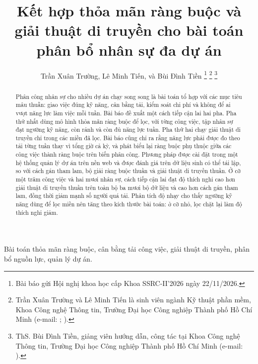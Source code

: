 \documentclass{IEEEtran}
\begin{document}
\title{Kết hợp thỏa mãn ràng buộc và giải thuật di truyền cho bài toán phân bổ nhân sự đa dự án}

\author{Trần Xuân Trường, Lê Minh Tiến, và Bùi Đình Tiền
\thanks{Bài báo gửi Hội nghị khoa học cấp Khoa SSRC-II'2026 ngày 22/11/2026.}
\thanks{Trần Xuân Trường và Lê Minh Tiến là sinh viên ngành Kỹ thuật phần mềm, Khoa Công nghệ Thông tin, Trường Đại học Công nghiệp Thành phố Hồ Chí Minh (e-mail: \underline{\hspace{3cm}}; \underline{\hspace{3cm}}).}
\thanks{ThS. Bùi Đình Tiền, giảng viên hướng dẫn, công tác tại Khoa Công nghệ Thông tin, Trường Đại học Công nghiệp Thành phố Hồ Chí Minh (e-mail: \underline{\hspace{3cm}}).}}

\maketitle

\begin{abstract}
Phân công nhân sự cho nhiều dự án chạy song song là bài toán tổ hợp với các mục tiêu mâu thuẫn: giao việc đúng kỹ năng, cân bằng tải, kiểm soát chi phí và không để ai vượt năng lực làm việc mỗi tuần. Bài báo đề xuất một cách tiếp cận lai hai pha. Pha thứ nhất dùng mô hình thỏa mãn ràng buộc để lọc, với từng công việc, tập nhân sự đạt ngưỡng kỹ năng, còn rảnh và còn đủ năng lực tuần. Pha thứ hai chạy giải thuật di truyền chỉ trong các miền đã lọc. Bài báo cũng chỉ ra rằng năng lực phải được đo theo tải từng tuần thay vì tổng giờ cả kỳ, và phát biểu lại ràng buộc phụ thuộc giữa các công việc thành ràng buộc trên biến phân công. Phương pháp được cài đặt trong một hệ thống quản lý dự án trên nền web và được đánh giá trên dữ liệu sinh có thể tái lập, so với cách gán tham lam, bộ giải ràng buộc thuần và giải thuật di truyền thuần. Ở cỡ một trăm công việc và hai mươi nhân sự, cách tiếp cận lai đạt độ thích nghi cao hơn giải thuật di truyền thuần trên toàn bộ ba mươi bộ dữ liệu và cao hơn cách gán tham lam, đồng thời giảm mạnh số người quá tải. Phân tích độ nhạy cho thấy ngưỡng kỹ năng dùng để lọc miền nên tăng theo kích thước bài toán: ở cỡ nhỏ, lọc chặt lại làm độ thích nghi giảm.
\end{abstract}

\begin{IEEEkeywords}
Bài toán thỏa mãn ràng buộc, cân bằng tải công việc, giải thuật di truyền, phân bổ nguồn lực, quản lý dự án.
\end{IEEEkeywords}
\end{document}
